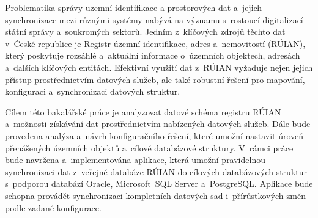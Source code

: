 Problematika správy uzemní identifikace a prostorových dat a~jejich synchronizace mezi různými systémy
nabývá na významu s~rostoucí digitalizací státní správy a~soukromých sektorů.
Jedním z~klíčových zdrojů těchto dat v~České republice je Registr územní identifikace,
adres a~nemovitostí (RÚIAN), který poskytuje rozsáhlé a~aktuální informace o~územních
objektech, adresách a~dalších klíčových entitách. Efektivní využití dat z~RÚIAN vyžaduje
nejen jejich přístup prostřednictvím datových služeb, ale také robustní řešení pro mapování,
konfiguraci a~synchronizaci datových struktur.

Cílem této bakalářské práce je analyzovat datové schéma registru RÚIAN a~možnosti získávání
dat prostřednictvím nabízených datových služeb. Dále bude provedena analýza a~návrh konfiguračního
řešení, které umožní nastavit úroveň přenášených územních objektů a~cílové databázové struktury.
V~rámci práce bude navržena a~implementována aplikace, která umožní pravidelnou synchronizaci dat
z~veřejné databáze RÚIAN do cílových databázových struktur s~podporou databází Oracle,
Microsoft~SQL Server a~PostgreSQL. Aplikace bude schopna provádět synchronizaci kompletních datových
sad i~přírůstkových změn podle zadané konfigurace.